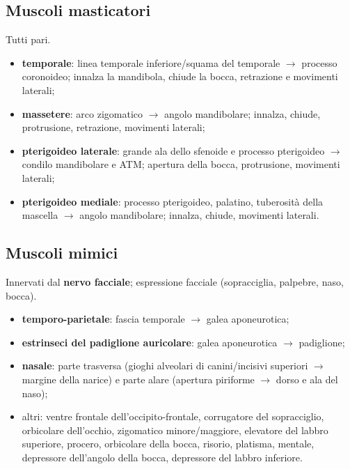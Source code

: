 \subsection{Muscoli masticatori}
Tutti pari.
\begin{itemize}
  \item \textbf{temporale}: linea temporale inferiore/squama del temporale $\rightarrow$ processo
    coronoideo; innalza la mandibola, chiude la bocca, retrazione e movimenti laterali;
  \item \textbf{massetere}: arco zigomatico $\rightarrow$ angolo mandibolare; innalza, chiude,
    protrusione, retrazione, movimenti laterali;
  \item \textbf{pterigoideo laterale}: grande ala dello sfenoide e processo pterigoideo $\rightarrow$
    condilo mandibolare e ATM; apertura della bocca, protrusione, movimenti laterali;
  \item \textbf{pterigoideo mediale}: processo pterigoideo, palatino, tuberosità della mascella
    $\rightarrow$ angolo mandibolare; innalza, chiude, movimenti laterali.
\end{itemize}

\subsection{Muscoli mimici}
Innervati dal \textbf{nervo facciale}; espressione facciale (sopracciglia, palpebre, naso, bocca).
\begin{itemize}
  \item \textbf{temporo-parietale}: fascia temporale $\rightarrow$ galea aponeurotica;
  \item \textbf{estrinseci del padiglione auricolare}: galea aponeurotica $\rightarrow$ padiglione;
  \item \textbf{nasale}: parte trasversa (gioghi alveolari di canini/incisivi superiori $\rightarrow$
    margine della narice) e parte alare (apertura piriforme $\rightarrow$ dorso e ala del naso);
  \item altri: ventre frontale dell'occipito-frontale, corrugatore del sopracciglio, orbicolare
    dell'occhio, zigomatico minore/maggiore, elevatore del labbro superiore, procero, orbicolare
    della bocca, risorio, platisma, mentale, depressore dell'angolo della bocca, depressore del
    labbro inferiore.
\end{itemize}

